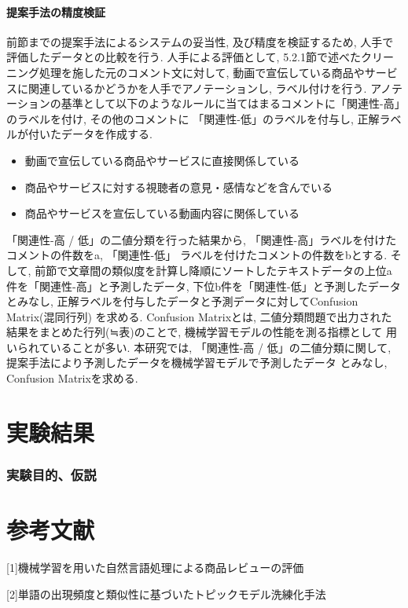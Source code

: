 \documentclass{ltjarticle}
\begin{document}
\subsection{提案手法の精度検証}
前節までの提案手法によるシステムの妥当性, 及び精度を検証するため, 人手で評価したデータとの比較を行う. 
人手による評価として, 5.2.1節で述べたクリーニング処理を施した元のコメント文に対して, 
動画で宣伝している商品やサービスに関連しているかどうかを人手でアノテーションし, ラベル付けを行う. 
アノテーションの基準として以下のようなルールに当てはまるコメントに「関連性-高」のラベルを付け, その他のコメントに
「関連性-低」のラベルを付与し, 正解ラベルが付いたデータを作成する. 
\vspace{5truept}

\begin{itemize}
    \item 動画で宣伝している商品やサービスに直接関係している
    \item 商品やサービスに対する視聴者の意見・感情などを含んでいる
    \item 商品やサービスを宣伝している動画内容に関係している
\end{itemize}
\vspace{5truept}

\noindent
「関連性-高 / 低」の二値分類を行った結果から, 「関連性-高」ラベルを付けたコメントの件数をa, 「関連性-低」
ラベルを付けたコメントの件数をbとする. 
そして, 前節で文章間の類似度を計算し降順にソートしたテキストデータの上位a件を「関連性-高」と予測したデータ, 
下位b件を「関連性-低」と予測したデータとみなし, 正解ラベルを付与したデータと予測データに対してConfusion Matrix(混同行列)
を求める. Confusion Matrixとは, 二値分類問題で出力された結果をまとめた行列(≒表)のことで, 機械学習モデルの性能を測る指標として
用いられていることが多い. 本研究では, 「関連性-高 / 低」の二値分類に関して, 提案手法により予測したデータを機械学習モデルで予測したデータ
とみなし, Confusion Matrixを求める. 

\newpage
\part{実験結果}
\section{実験目的、仮説}
\part{参考文献}
[1]機械学習を用いた自然言語処理による商品レビューの評価

[2]単語の出現頻度と類似性に基づいたトピックモデル洗練化手法
\end{document}
